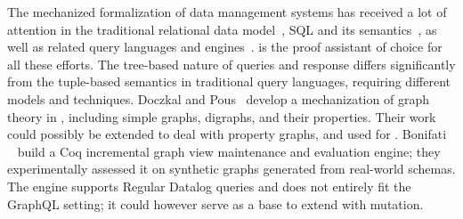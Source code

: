 The mechanized formalization of data management systems has received a lot of attention in the traditional relational data model~\cite{relationalcoq}, SQL and its semantics~\cite{sqlequiv, hottsql, vesqlengines, vesqlsemantics}, as well as related query languages and engines~\cite{certifdatalog, qcert}.
\coq is the proof assistant of choice for all these efforts. The tree-based nature of \gql queries and response differs significantly from the tuple-based semantics in traditional query languages, requiring different models and techniques.
Doczkal and Pous~\cite{graphtheory} develop a mechanization of graph theory in \coq, including simple graphs, digraphs, and their properties. Their work could possibly be extended to deal with property graphs, and used for \gcoql.
Bonifati \etal~\cite{graphviewmaint} build a Coq incremental graph view maintenance and evaluation engine; they experimentally assessed it on synthetic graphs generated from real-world schemas. The engine supports Regular Datalog queries and does not entirely fit the GraphQL setting; it could however serve as a base to extend \gcoql with mutation.

